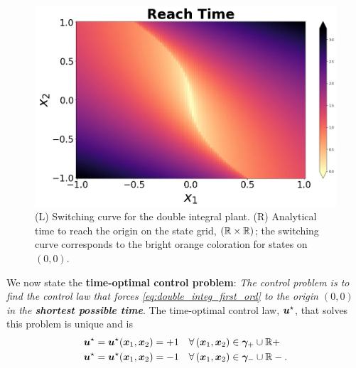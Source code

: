 \begin{figure}[tb!]
\begin{minipage}[b]{.24\textwidth}
		\includegraphics[width=1.0\textwidth, height=1.0\textwidth]{figures/attr.jpg}
	\end{minipage}
	\caption{\footnotesize (L) Switching curve for the double integral plant. (R) Analytical time to reach the origin on the state grid, $\left(\mathbb{R} \times \mathbb{R}\right)$; the switching curve corresponds to the bright orange coloration for states on $(0,0)$.}
	\label{fig:attr}
\end{figure}

%
%
We now state the \textbf{time-optimal control problem}: \textit{The control problem is to find the control law that forces \eqref{eq:double_integ_first_ord} to the origin $\left(0,0\right)$ in the \textbf{shortest possible time}}. The time-optimal control law, $\bm{u}^\star$, that solves this problem is unique and is
%
\begin{align}
	\bm{u}^\star &= \bm{u}^\star(\bm{x}_1, \bm{x}_2) = +1 \quad \forall \left(\bm{x}_1, \bm{x}_2\right) \in \bm{\gamma}_+ \cup \mathbb{R}+ \\
	\bm{u}^\star &= \bm{u}^\star(\bm{x}_1, \bm{x}_2) = -1 \quad \forall \left(\bm{x}_1, \bm{x}_2\right) \in \bm{\gamma}_- \cup \mathbb{R}-. \nonumber
\end{align}
%


